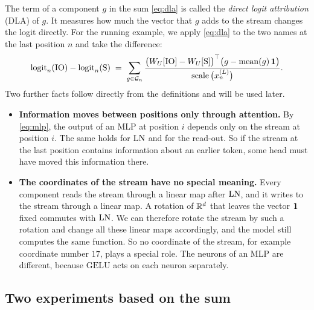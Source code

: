 The term of a component $g$ in the sum \eqref{eq:dla} is called the \emph{direct logit attribution} (DLA) of
$g$. It measures how much the vector that $g$ adds to the stream changes the logit directly. For the running
example, we apply \eqref{eq:dla} to the two names at the last position $n$ and take the difference:
\begin{equation}\label{eq:dla-ld}
\mathrm{logit}_n(\mathrm{IO})-\mathrm{logit}_n(\mathrm{S}) \;=\; \sum_{g\in\mathcal G_n}
\frac{\big(W_U[\mathrm{IO}]-W_U[\mathrm{S}]\big)^\top\big(g-\operatorname{mean}(g)\,\mathbf{1}\big)}{\operatorname{scale}\big(x_n^{(L)}\big)} .
\end{equation}
Two further facts follow directly from the definitions and will be used later.
\begin{itemize}
\item \textbf{Information moves between positions only through attention.} By \eqref{eq:mlp}, the output of an
MLP at position $i$ depends only on the stream at position $i$. The same holds for $\mathrm{LN}$ and for the read-out. So if
the stream at the last position contains information about an earlier token, some head must have moved this
information there.
\item \textbf{The coordinates of the stream have no special meaning.} Every component reads the stream through
a linear map after $\mathrm{LN}$, and it writes to the stream through a linear map. A rotation of $\mathbb{R}^d$ that leaves the
vector $\mathbf{1}$ fixed commutes with $\mathrm{LN}$. We can therefore rotate the stream by such a rotation and change all these
linear maps accordingly, and the model still computes the same function. So no coordinate of the stream, for
example coordinate number $17$, plays a special role. The neurons of an MLP are different, because $\mathrm{GELU}$
acts on each neuron separately.
\end{itemize}

\subsection{Two experiments based on the sum}

